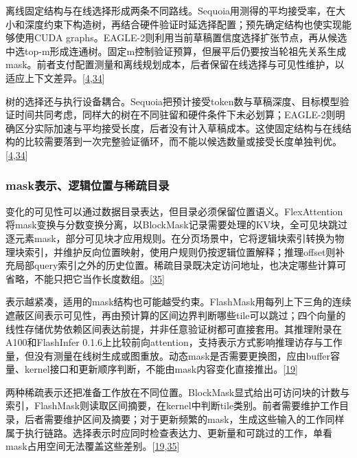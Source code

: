 \documentclass[
  UTF8,
  zihao=5]{ctexart}
\begin{document}
离线固定结构与在线选择形成两条不同路线。Sequoia用测得的平均接受率，在大小和深度约束下构造树，再结合硬件验证时延选择配置；预先确定结构也使实现能够使用CUDA
graphs。EAGLE-2则利用当前草稿置信度选择扩张节点，再从候选中选top-m形成连通树。固定m控制验证预算，但展平后仍要按当轮祖先关系生成mask。前者支付配置测量和离线规划成本，后者保留在线选择与可见性维护，以适应上下文差异。{[}\protect\hyperlink{ref-li2024eagle2}{4},\protect\hyperlink{ref-chen2024sequoia}{34}{]}

树的选择还与执行设备耦合。Sequoia把预计接受token数与草稿深度、目标模型验证时间共同考虑，同样大的树在不同驻留和硬件条件下未必划算；EAGLE-2则明确区分实际加速与平均接受长度，后者没有计入草稿成本。这使固定结构与在线结构的比较需要落到一次完整验证循环，而不能以候选数量或接受长度单独判优。{[}\protect\hyperlink{ref-li2024eagle2}{4},\protect\hyperlink{ref-chen2024sequoia}{34}{]}

\hypertarget{maskux8868ux793aux903bux8f91ux4f4dux7f6eux4e0eux7a00ux758fux76eeux5f55}{%
\subsubsection{mask表示、逻辑位置与稀疏目录}\label{maskux8868ux793aux903bux8f91ux4f4dux7f6eux4e0eux7a00ux758fux76eeux5f55}}

变化的可见性可以通过数据目录表达，但目录必须保留位置语义。FlexAttention将mask变换与分数变换分离，以BlockMask记录需要处理的KV块，全可见块跳过逐元素mask，部分可见块才应用规则。在分页场景中，它将逻辑块索引转换为物理块索引，并维护反向位置映射，使用户规则仍按逻辑位置解释；推理offset则补充局部query索引之外的历史位置。稀疏目录既决定访问地址，也决定哪些计算可省略，不能只把它当作长度数组。{[}\protect\hyperlink{ref-dong2025flexattention}{35}{]}

表示越紧凑，适用的mask结构也可能越受约束。FlashMask用每列上下三角的连续遮蔽区间表示可见性，再由预计算的区间边界判断哪些tile可以跳过；四个向量的线性存储优势依赖区间表达前提，并非任意验证树都可直接套用。其推理附录在A100和FlashInfer
0.1.6上比较前向attention，支持表示方式影响推理访存与工作量，但没有测量在线树生成或图重放。动态mask是否需要更换图，应由buffer容量、kernel接口和更新顺序判断，不能由mask内容变化直接推出。{[}\protect\hyperlink{ref-wang2025flashmask}{19}{]}

两种稀疏表示还把准备工作放在不同位置。BlockMask显式给出可访问块的计数与索引，FlashMask则读取区间摘要，在kernel中判断tile类别。前者需要维护工作目录，后者需要维护区间及摘要；对于更新频繁的mask，生成这些输入的工作同样属于执行链路。选择表示时应同时检查表达力、更新量和可跳过的工作，单看mask占用空间无法覆盖这些差别。{[}\protect\hyperlink{ref-wang2025flashmask}{19},\protect\hyperlink{ref-dong2025flexattention}{35}{]}
\end{document}
